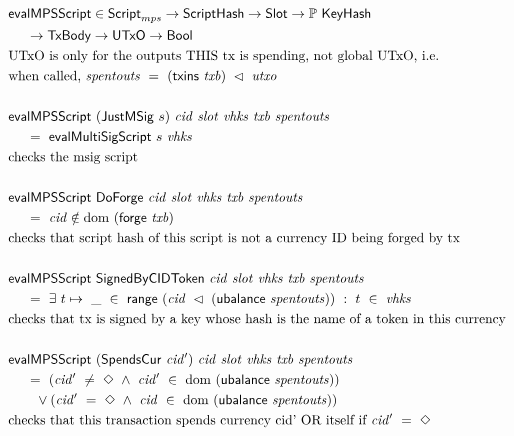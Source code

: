 \begin{figure*}[htb]
  \begin{align*}
    & \fun{evalMPSScript} \in\ScriptMPS\to\ScriptHash\to\Slot\to\powerset\KeyHash \\
    &~~~~\to\TxBody\to\UTxO \to\Bool  \\
    & \text{UTxO is only for the outputs THIS tx is spending, not global UTxO, i.e.} \\
    & \text{when called,}~\var{spentouts}~=~(\fun{txins}~\var{txb}) ~\restrictdom~\var{utxo} \\~\\
    & \fun{evalMPSScript}  ~(\type{JustMSig}~s)~\var{cid}~\var{slot}~\var{vhks}
     ~\var{txb}~\var{spentouts} \\
    &~~~~ =~ \fun{evalMultiSigScript}~s~\var{vhks} \\
    & \text {checks the msig script}\\~\\
    & \fun{evalMPSScript}
     ~\type{DoForge}~\var{cid}~ \var{slot}~\var{vhks} ~\var{txb}~\var{spentouts} \\
    &~~~~ =~ \var{cid} \notin \dom~(\fun{forge}~\var{txb}) \\
    & \text {checks that script hash of this script is not a currency ID being forged by tx}  \\~\\
    & \fun{evalMPSScript}
     ~\type{SignedByCIDToken}~\var{cid}~ \var{slot}~\var{vhks} ~\var{txb}~\var{spentouts} \\
    &~~~~ =~ \exists~t\mapsto ~\_~\in~ \fun{range}~(\var{cid}~ \restrictdom~(\fun{ubalance}~\var{spentouts})) ~:~ t~\in~\var{vhks} \\
    & \text{checks that tx is signed by a key whose hash is the name of a token in this currency}
    \\~\\
    & \fun{evalMPSScript}
     ~(\type{SpendsCur}~\var{cid'})~\var{cid}~ \var{slot}~\var{vhks} ~\var{txb}~\var{spentouts} \\
    &~~~~ =~ (\var{cid'}~\neq~\Nothing ~\wedge ~\var{cid'}~\in~ \dom~(\fun{ubalance}~\var{spentouts}))\\
    &~~~~~~ \vee (\var{cid'}~=~\Nothing ~\wedge ~\var{cid}~\in~ \dom~(\fun{ubalance}~\var{spentouts})) \\
    & \text{checks that this transaction spends currency cid' OR itself if}~\var{cid'}~=~\Nothing
    \\~\\

\end{align*}
\end{figure*}
